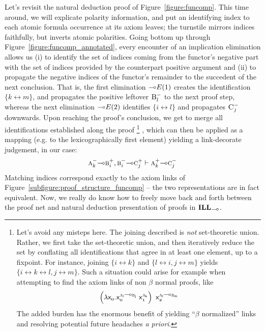 Let's revisit the natural deduction proof of Figure~\ref{figure:funcomp}.
This time around, we will explicate polarity information, and put an identifying index to each atomic formula occurrence at its axiom leaves; 
the turnstile mirrors indices faithfully, but inverts atomic polarities.
Going bottom up through Figure~\ref{figure:funcomp_annotated}, every encounter of an implication elimination allows us (i) to identify the set of indices coming from the functor's negative part with the set of indices provided by the counterpart positive argument and (ii) to propagate the negative indices of the functor's remainder to the succedent of the next conclusion.
That is, the first elimination $\li E(1)$ creates the identification $\{k \leftrightarrow m\}$, and propagates the positive leftover $\normalfont\textsc{B}^{-}_l$ to the next proof step, whereas the next elimination $\li E(2)$ identifies $\{i \leftrightarrow l\}$ and propagates $\normalfont\textsc{C}^{-}_j$ downwards.
Upon reaching the proof's conclusion, we get to merge all identifications established along the proof%
\footnote{
Let's avoid any misteps here. The joining described is \textit{not} set-theoretic union. Rather, we first take the set-theoretic union, and then iteratively reduce the set by conflating all identifications that agree in at least one element, up to a fixpoint.
For instance, joining $\{ i \leftrightarrow k\}$ and $\{ l\leftrightarrow i, j \leftrightarrow m\}$ yields $\{i \leftrightarrow k \leftrightarrow l, j \leftrightarrow m \}$. Such a situation could arise for example when attempting to find the axiom links of non $\beta$ normal proofs, like
\[
\term{\left(\lam \Var{0}.\Var{0}^{\prop{a}_i \li \prop{b}_j}~\Var{1}^{\prop{a}_k}\right)~\Var{2}^{\prop{a}_l \li \prop{b}_m}}
\]
The added burden has the enormous benefit of yielding ``$\beta$ normalized'' links and resolving potential future headaches \textit{a priori}.
}%
, which can then be applied as a mapping (e.g. to the lexicographically first element) yielding a link-decorate judgement, in our case:
\[
	\nprop{a}_k \li \pprop{b}_i, \nprop{b}_i \li \pprop{c}_j \vdash \pprop{a}_k \li \nprop{c}_j
\]
Matching indices correspond exactly to the axiom links of Figure~\ref{subfigure:proof_structure_funcomp} -- the two representations are in fact equivalent.
Now, we really do know how to freely move back and forth between the proof net and natural deduction presentation of proofs in $\ILL_{\li}$.

